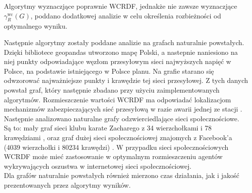 Algorytmy wyznaczjące poprawnie WCRDF, jednakże nie zawsze wyznaczjące $\gamma_{R}^{\text{wc}}(G)$, poddano dodatkowej analizie w celu określenia rozbieżności od optymalnego wyniku.

Następnie algorytmy zostały poddane analizie na grafach naturalnie powstałych.\\

Dzięki bibliotece geopandas utworzono mapę Polski, a nastepnie naniesiono na niej punkty odpowiadające węzłom przesyłowym sieci najwyższych napięć w Polsce, na podstawie istniejącego w Polsce planu. Na grafie starano się odwzorować najważniejsze punkty i krawędzie tej sieci przesyłowej. Z tych danych powstał graf, który następnie zbadano przy użyciu zaimplementowanych algorytmów. Rozmieszczenie wartości WCRDF ma odpowiadać lokalizacjom mechanizmów zabezpieczających sieć przesyłową w razie awarii jednej ze stacji \cite{POLAND}.\\

Następnie analizowano naturalne grafy odzwierciedlające sieci społecznościowe. Są to: mały graf sieci klubu karate Zacharego z 34 wierzchołkami i 78 krawędziami \cite{KARATE}, oraz graf dużej sieci społecznościowej znajomych z Facebook'a (4039 wierzchołki i 80234 krawędzi) \cite{FACEBOOK}. W przypadku sieci społecznościowych WCRDF może mieć zastosowanie w optymalnym rozmieszczeniu agentów wykrywających oszustwa w internetowej sieci społecznościowej.\\

Dla grafów naturalnie powstałych również mierzono czas działania, jak i jakość prezentowanych przez algorytmy wyników.



